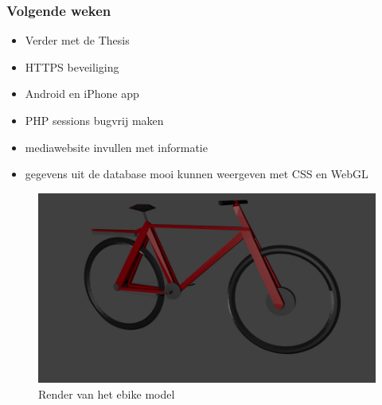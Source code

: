 \subsubsection*{Volgende weken}
\begin{itemize}
\item Verder met de Thesis
\item HTTPS beveiliging
\item Android en iPhone app
\item PHP sessions bugvrij maken
\item mediawebsite invullen met informatie
\item gegevens uit de database mooi kunnen weergeven met CSS en WebGL
\end{itemize}


\begin{figure}[!h]
\begin{center}\includegraphics[width=12cm]{ebike.png}
\caption{Render van het ebike model}
\label{img:fiets}
\end{center}
\end{figure}
